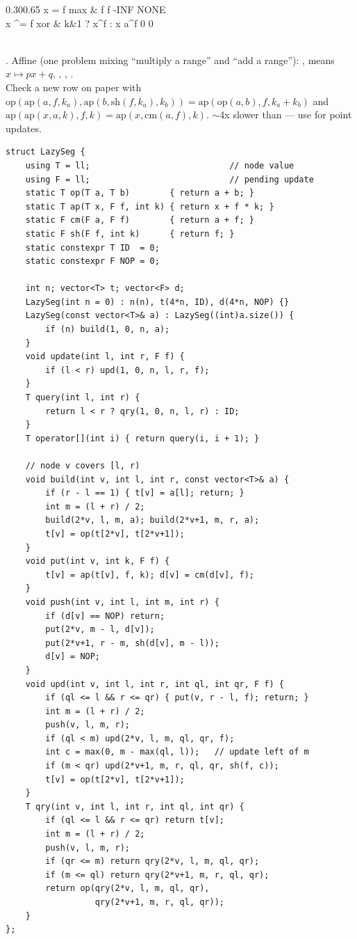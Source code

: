 {{\begin{ctab}{0.30}{0.65}
x = f \hfill max & f \hfill f \hfill -INF \hfill NONE\\
x \textasciicircum= f \hfill xor & k\&1 ? x\textasciicircum f : x \hfill a\textasciicircum f \hfill 0 \hfill 0\\
\end{ctab}}\\[0.3ex]
. Affine (one problem mixing ``multiply a range'' and ``add a
range''): ,  means $x \mapsto px+q$,
, , .\\[0.3ex]
Check a new row on paper with
$\mathrm{op}(\mathrm{ap}(a,f,k_a), \mathrm{ap}(b,\mathrm{sh}(f,k_a),k_b)) = \mathrm{ap}(\mathrm{op}(a,b), f, k_a{+}k_b)$
and $\mathrm{ap}(\mathrm{ap}(x,a,k),f,k) = \mathrm{ap}(x,\mathrm{cm}(a,f),k)$.
$\sim$4x slower than  --- use  for point updates.}

\begin{lstlisting}
struct LazySeg {
    using T = ll;                            // node value
    using F = ll;                            // pending update
    static T op(T a, T b)        { return a + b; }
    static T ap(T x, F f, int k) { return x + f * k; }
    static F cm(F a, F f)        { return a + f; }
    static F sh(F f, int k)      { return f; }
    static constexpr T ID  = 0;
    static constexpr F NOP = 0;

    int n; vector<T> t; vector<F> d;
    LazySeg(int n = 0) : n(n), t(4*n, ID), d(4*n, NOP) {}
    LazySeg(const vector<T>& a) : LazySeg((int)a.size()) {
        if (n) build(1, 0, n, a);
    }
    void update(int l, int r, F f) {
        if (l < r) upd(1, 0, n, l, r, f);
    }
    T query(int l, int r) {
        return l < r ? qry(1, 0, n, l, r) : ID;
    }
    T operator[](int i) { return query(i, i + 1); }

    // node v covers [l, r)
    void build(int v, int l, int r, const vector<T>& a) {
        if (r - l == 1) { t[v] = a[l]; return; }
        int m = (l + r) / 2;
        build(2*v, l, m, a); build(2*v+1, m, r, a);
        t[v] = op(t[2*v], t[2*v+1]);
    }
    void put(int v, int k, F f) {
        t[v] = ap(t[v], f, k); d[v] = cm(d[v], f);
    }
    void push(int v, int l, int m, int r) {
        if (d[v] == NOP) return;
        put(2*v, m - l, d[v]);
        put(2*v+1, r - m, sh(d[v], m - l));
        d[v] = NOP;
    }
    void upd(int v, int l, int r, int ql, int qr, F f) {
        if (ql <= l && r <= qr) { put(v, r - l, f); return; }
        int m = (l + r) / 2;
        push(v, l, m, r);
        if (ql < m) upd(2*v, l, m, ql, qr, f);
        int c = max(0, m - max(ql, l));   // update left of m
        if (m < qr) upd(2*v+1, m, r, ql, qr, sh(f, c));
        t[v] = op(t[2*v], t[2*v+1]);
    }
    T qry(int v, int l, int r, int ql, int qr) {
        if (ql <= l && r <= qr) return t[v];
        int m = (l + r) / 2;
        push(v, l, m, r);
        if (qr <= m) return qry(2*v, l, m, ql, qr);
        if (m <= ql) return qry(2*v+1, m, r, ql, qr);
        return op(qry(2*v, l, m, ql, qr),
                  qry(2*v+1, m, r, ql, qr));
    }
};
\end{lstlisting}

